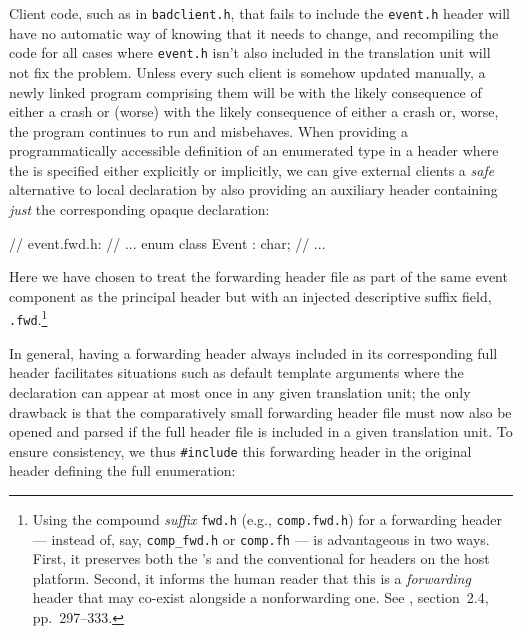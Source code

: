\noindent Client code, such as in \lstinline!badclient.h!, that fails to include the
\lstinline!event.h! header will have no automatic way of knowing that it
needs to change, and recompiling the code for all cases where
\lstinline!event.h! isn't also included in the translation unit will not
fix the problem. Unless every such client is somehow updated manually, a
newly linked program comprising them will be  with the likely
consequence of either a crash or (worse) with the likely consequence of either a crash or, worse, the program continues to run and misbehaves. When providing a programmatically accessible definition of
an enumerated type in a header where the  is
specified either explicitly or implicitly, we can give external
clients a \emph{safe} alternative to local declaration by also providing
an auxiliary header containing \emph{just} the corresponding opaque
declaration:

\begin{emcppslisting}[emcppsbatch=e7]
// event.fwd.h:
// ...
enum class Event : char;
// ...
\end{emcppslisting}

\noindent Here we have chosen to treat the forwarding header file as part of the same event component as the principal header but with an injected descriptive suffix field, \lstinline!.fwd!.\footnote{Using the compound \emph{suffix} \lstinline!fwd.h! (e.g., \lstinline!comp.fwd.h!) for a forwarding header --- instead of, say, \lstinline!comp_fwd.h! or \lstinline!comp.fh! --- is advantageous in two ways. First, it preserves both the 's  and the conventional  for headers on the host platform.  Second, it informs the human reader that this is a \emph{forwarding} header that may co-exist alongside a nonforwarding one. See \cite{lakos20}, section~2.4, pp.~297--333.}

In general, having a forwarding header always included in its
corresponding full header facilitates situations such as default
template arguments where the declaration can appear at most once in any
given translation unit; the only drawback is that the
comparatively small forwarding header file must now also be opened and
parsed if the full header file is included in a given translation
unit. To ensure consistency, we thus \lstinline!#include! this forwarding
header in the original header defining the full enumeration:


